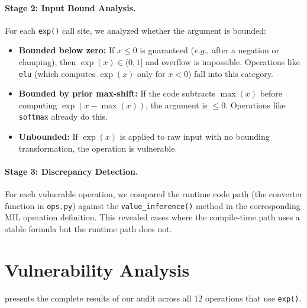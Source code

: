 \documentclass[10pt,twocolumn]{article}
\newcommand{\expop}{\texttt{exp()}}
\newcommand{\eg}{\textit{e.g.}}
\begin{document}
\paragraph{Stage 2: Input Bound Analysis.}
For each \expop{} call site, we analyzed whether the argument is
bounded:

\begin{itemize}[leftmargin=*,itemsep=1pt]
  \item \textbf{Bounded below zero:} If $x \leq 0$ is guaranteed
    (\eg{}, after a negation or clamping), then
    $\exp(x) \in (0, 1]$ and overflow is impossible.  Operations
    like \texttt{elu} (which computes $\exp(x)$ only for $x < 0$)
    fall into this category.

  \item \textbf{Bounded by prior max-shift:} If the code subtracts
    $\max(x)$ before computing $\exp(x - \max(x))$, the argument
    is $\leq 0$.  Operations like \texttt{softmax} already do this.

  \item \textbf{Unbounded:} If $\exp(x)$ is applied to raw input
    with no bounding transformation, the operation is vulnerable.
\end{itemize}

\paragraph{Stage 3: Discrepancy Detection.}
For each vulnerable operation, we compared the runtime code path (the converter
function in \texttt{ops.py}) against the \texttt{value\_inference()} method in
the corresponding MIL operation definition.  This revealed cases where the
compile-time path uses a stable formula but the runtime path does not.

\section{Vulnerability Analysis}
\label{sec:results}

 presents the complete results of our
audit across all 12 operations that use \expop{}.
\end{document}
